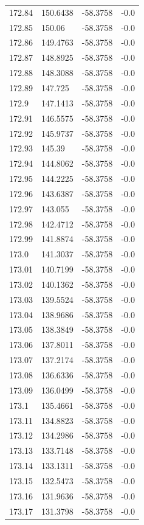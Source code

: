 \begin{table}[H]
\begin{tabular}{llll}
172.84 & 150.6438 & -58.3758 & -0.0 \\
172.85 & 150.06 & -58.3758 & -0.0 \\
172.86 & 149.4763 & -58.3758 & -0.0 \\
172.87 & 148.8925 & -58.3758 & -0.0 \\
172.88 & 148.3088 & -58.3758 & -0.0 \\
172.89 & 147.725 & -58.3758 & -0.0 \\
172.9 & 147.1413 & -58.3758 & -0.0 \\
172.91 & 146.5575 & -58.3758 & -0.0 \\
172.92 & 145.9737 & -58.3758 & -0.0 \\
172.93 & 145.39 & -58.3758 & -0.0 \\
172.94 & 144.8062 & -58.3758 & -0.0 \\
172.95 & 144.2225 & -58.3758 & -0.0 \\
172.96 & 143.6387 & -58.3758 & -0.0 \\
172.97 & 143.055 & -58.3758 & -0.0 \\
172.98 & 142.4712 & -58.3758 & -0.0 \\
172.99 & 141.8874 & -58.3758 & -0.0 \\
173.0 & 141.3037 & -58.3758 & -0.0 \\
173.01 & 140.7199 & -58.3758 & -0.0 \\
173.02 & 140.1362 & -58.3758 & -0.0 \\
173.03 & 139.5524 & -58.3758 & -0.0 \\
173.04 & 138.9686 & -58.3758 & -0.0 \\
173.05 & 138.3849 & -58.3758 & -0.0 \\
173.06 & 137.8011 & -58.3758 & -0.0 \\
173.07 & 137.2174 & -58.3758 & -0.0 \\
173.08 & 136.6336 & -58.3758 & -0.0 \\
173.09 & 136.0499 & -58.3758 & -0.0 \\
173.1 & 135.4661 & -58.3758 & -0.0 \\
173.11 & 134.8823 & -58.3758 & -0.0 \\
173.12 & 134.2986 & -58.3758 & -0.0 \\
173.13 & 133.7148 & -58.3758 & -0.0 \\
173.14 & 133.1311 & -58.3758 & -0.0 \\
173.15 & 132.5473 & -58.3758 & -0.0 \\
173.16 & 131.9636 & -58.3758 & -0.0 \\
173.17 & 131.3798 & -58.3758 & -0.0 \\

\end{tabular}
\end{table}
